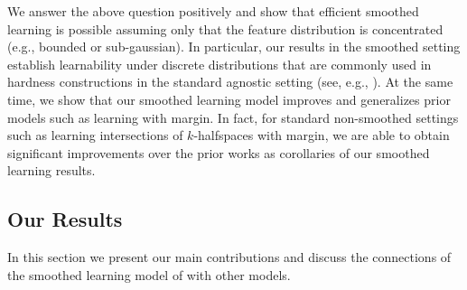 \documentclass[10pt,a4paper]{article}
\newcommand{\1}{\Ind}
\begin{document}
We answer the above question positively and show that efficient smoothed learning is possible assuming only that the feature distribution is concentrated (e.g., bounded or sub-gaussian). 
In particular, our results in the smoothed setting establish learnability under 
discrete distributions that are commonly used in hardness constructions in the standard 
agnostic setting (see, e.g., \cite{DanielyV21}).
At the same time, we show that our smoothed learning model improves and generalizes prior models such as learning with margin. In fact, for standard non-smoothed settings such as learning intersections of $k$-halfspaces with margin, we are able to obtain significant improvements over the prior works as corollaries of our smoothed learning results.
















\subsection{Our Results}
\label{sec:results}
In this section we present our main contributions and discuss the connections of the smoothed learning model of  with other models.
\end{document}
